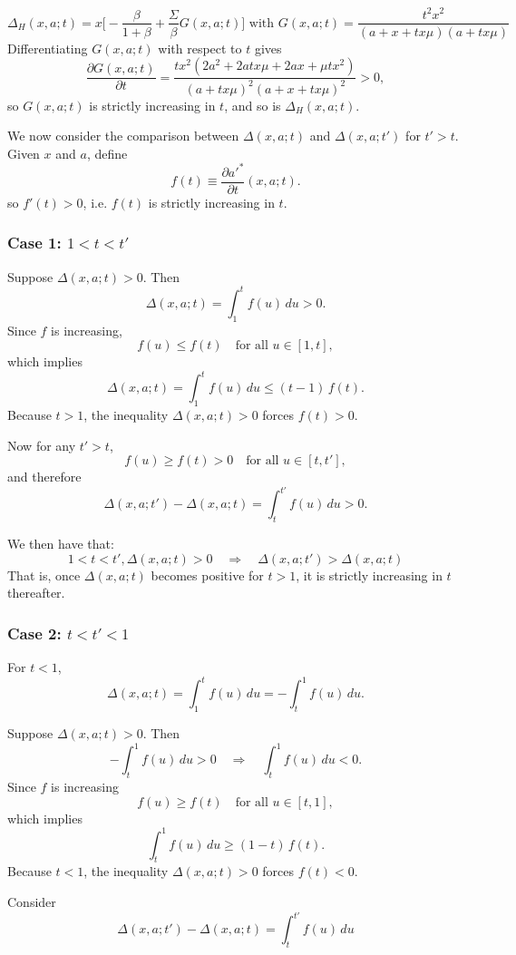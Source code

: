 \documentclass[12pt]{article}
\begin{document}
\[\Delta_{H}(x,a;t) = x\big[-\frac{\beta}{1+\beta} + \frac{\Sigma}{\beta}G(x,a;t)\big] \text{ with } G(x,a;t) = \frac{t^2x^2}{(a+x+tx\mu)(a+tx\mu)}
\]
Differentiating $G(x,a;t)$ with respect to $t$ gives
\[
\frac{\partial G(x,a;t)}{\partial t}
=\frac{tx^2(2a^2+2atx\mu+2ax+\mu t x^2)}{(a+ tx\mu)^2(a+x+tx\mu)^2}
>0,
\]
so $G(x,a;t)$ is strictly increasing in $t$, and so is $\Delta_{H}(x,a;t)$.

\bigskip\noindent
We now consider the comparison between $\Delta(x,a;t)$ and $\Delta(x,a;t')$ for $t'>t$.
Given $x$ and $a$, define
\[
f(t)\equiv \frac{\partial a'^*}{\partial t}(x,a;t).
\]
so $f'(t)>0$, i.e. $f(t)$ is strictly increasing in $t$.

\subsubsection*{Case 1: $1<t<t'$}

Suppose $\Delta(x,a;t)>0$. Then
\[
\Delta(x,a;t)
=\int_{1}^{t} f(u)\,du>0.
\]
Since $f$ is increasing,
\[
f(u)\le f(t)\quad\text{for all } u\in[1,t],
\]
which implies
\[
\Delta(x,a;t)
=\int_{1}^{t} f(u)\,du
\le (t-1)\,f(t).
\]
Because $t>1$, the inequality $\Delta(x,a;t)>0$ forces $f(t)>0$.

Now for any $t'>t$,
\[
f(u)\ge f(t)>0
\quad\text{for all }u\in[t,t'],
\]
and therefore
\[
\Delta(x,a;t')-\Delta(x,a;t)
=
\int_{t}^{t'} f(u)\,du
>0.
\]

We then have that:
\begin{equation}
1<t<t', \Delta(x,a;t)>0
\quad\Longrightarrow\quad
\Delta(x,a;t')>\Delta(x,a;t)
\end{equation}
That is, once $\Delta(x,a;t)$ becomes positive for $t>1$, it is strictly increasing in $t$ thereafter.

\subsubsection*{Case 2: $t<t'<1$}

For $t<1$,
\[
\Delta(x,a;t)
=\int_{1}^{t} f(u)\,du
= -\int_{t}^{1} f(u)\,du.
\]

Suppose $\Delta(x,a;t)>0$. Then
\[
-\int_{t}^{1} f(u)\,du>0
\quad\Longrightarrow\quad
\int_{t}^{1} f(u)\,du<0.
\]
Since $f$ is increasing 
\[
f(u)\ge f(t)\quad\text{for all } u\in[t,1],
\]
which implies
\[
\int_{t}^{1} f(u)\,du
\ge (1-t)\,f(t).
\]
Because $t<1$, the inequality $\Delta(x,a;t)>0$ forces $f(t)<0$.

Consider 
\[
\Delta(x,a;t')-\Delta(x,a;t)
=\int_{t}^{t'} f(u)\,du
\]
\end{document}
